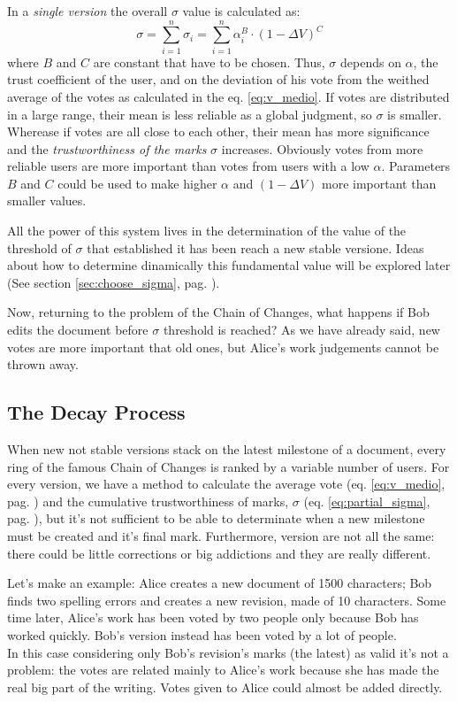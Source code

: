 \documentclass[a4paper,11pt]{article}
\newcommand{\sg}{$\sigma$ }
\newcommand{\al}{$\alpha$ }
\begin{document}
In a \emph{single version} the overall \sg value is calculated as:
\begin{equation} \label{eq:partial_sigma}
\sigma= \sum_{i=1}^n \sigma_i = \sum_{i=1}^n \alpha_i^B \cdot \left(1- \Delta V\right)^C
\end{equation}
where $B$ and $C$ are constant that have to be chosen.
Thus, \sg depends on $\alpha$, the trust coefficient of the user, and on the deviation of 
his vote from the weithed average of the votes as calculated in the eq. \ref{eq:v_medio}. 
If votes are distributed in a large range, their mean is less reliable as a global 
judgment, so \sg is smaller. Wherease if votes are all close to each other, their mean has 
more significance and the \emph{trustworthiness of the marks} \sg increases. Obviously 
votes from more reliable users are more important than votes from users with a low $\alpha
$. Parameters $B$ and $C$ could be used to make higher \al and $(1-\Delta V)$ more 
important than smaller values.

All the power of this system lives in the determination of the value of the threshold of $
\sigma$ that established it has been reach a new stable versione. Ideas about how to 
determine dinamically this fundamental value will be explored later (See section \ref{sec:choose_sigma}, pag. \pageref{sec:choose_sigma}).

Now, returning to the problem of the Chain of Changes, what happens if Bob edits the 
document before $\sigma$ threshold is reached? As we have already said, new votes are 
more important that old ones, but Alice's work judgements cannot be thrown away.

\subsection{The Decay Process} \label{sec:decay}
When new not stable versions stack on the latest milestone of a document, every ring of 
the famous Chain of Changes is ranked by a variable number of users. For every version, we 
have a method to calculate the average vote (eq. \ref{eq:v_medio}, pag. 
\pageref{eq:v_medio}) and the cumulative trustworthiness of marks, \sg (eq. 
\ref{eq:partial_sigma}, pag. \pageref{eq:partial_sigma}), but it's not sufficient to be 
able to determinate when a new milestone must be created and it's final mark. Furthermore, 
version are not all  the same: there could be little corrections or big addictions and 
they are really different. 

Let's make an example: Alice creates a new document of 1500 characters; Bob finds two 
spelling errors and creates a new revision, made of 10 characters. Some time later, 
Alice's work has been voted by two people only because Bob has worked quickly. Bob's 
version instead has been voted by a lot of people. \\ In this case considering only Bob's 
revision's marks (the latest) as valid it's not a problem: the votes are related mainly to 
Alice's work because she has made the real big part of the writing.  Votes given to Alice 
could almost be added directly.
\end{document}
